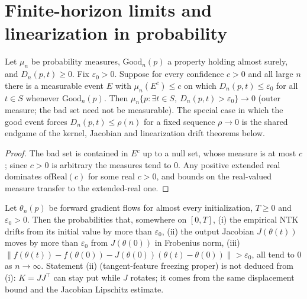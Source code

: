 \section{Finite-horizon limits and linearization in probability}\label{sec:ntktl:finiteHorizon}

\begin{lemma}\label{lem:ntktl:genericOuter}
  \leanok
Let $\mu_n$ be probability measures, $\mathrm{Good}_n(p)$ a property holding almost surely, and $D_n(p,t)\ge0$. Fix $\varepsilon_0>0$. Suppose for every confidence $c>0$ and all large $n$ there is a measurable event $E$ with $\mu_n(E^c)\le c$ on which $D_n(p,t)\le\varepsilon_0$ for all $t\in S$ whenever $\mathrm{Good}_n(p)$.
Then $\mu_n\{p:\exists t\in S,\ D_n(p,t)>\varepsilon_0\}\to0$ (outer measure; the bad set need not be measurable). The special case in which the good event forces $D_n(p,t)\le\rho(n)$ for a fixed sequence $\rho\to0$ is the shared endgame of the kernel, Jacobian and linearization drift theorems below.
\end{lemma}

\begin{proof}
  \leanok
The bad set is contained in $E^c$ up to a null set, whose measure is at most $c$; since $c>0$ is arbitrary the measures tend to $0$. Any positive extended real dominates $\mathrm{ofReal}(c)$ for some real $c>0$, and bounds on the real-valued measure transfer to the extended-real one.
\end{proof}

\begin{theorem}\label{thm:ntktl:finiteHorizonLimits}
  \leanok
Let $\theta_n(p)$ be forward gradient flows for almost every initialization, $T\ge0$ and $\varepsilon_0>0$. Then the probabilities that, somewhere on $[0,T]$,
(i) the empirical NTK drifts from its initial value by more than $\varepsilon_0$,
(ii) the output Jacobian $J(\theta(t))$ moves by more than $\varepsilon_0$ from $J(\theta(0))$ in Frobenius norm,
(iii) $\|f(\theta(t))-f(\theta(0))-J(\theta(0))(\theta(t)-\theta(0))\|>\varepsilon_0$,
all tend to $0$ as $n\to\infty$. Statement (ii) (tangent-feature freezing proper) is not deduced from (i): $K=JJ^\top$ can stay put while $J$ rotates; it comes from the same displacement bound and the Jacobian Lipschitz estimate.
\end{theorem}

